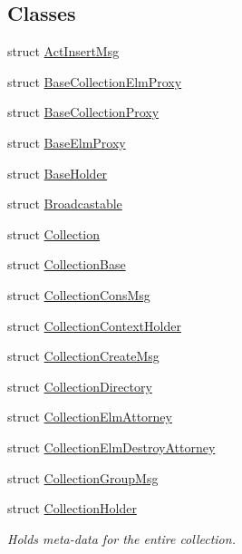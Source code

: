 \subsection*{Classes}
\begin{DoxyCompactItemize}
\item 
struct \hyperlink{structvt_1_1vrt_1_1collection_1_1_act_insert_msg}{Act\+Insert\+Msg}
\item 
struct \hyperlink{structvt_1_1vrt_1_1collection_1_1_base_collection_elm_proxy}{Base\+Collection\+Elm\+Proxy}
\item 
struct \hyperlink{structvt_1_1vrt_1_1collection_1_1_base_collection_proxy}{Base\+Collection\+Proxy}
\item 
struct \hyperlink{structvt_1_1vrt_1_1collection_1_1_base_elm_proxy}{Base\+Elm\+Proxy}
\item 
struct \hyperlink{structvt_1_1vrt_1_1collection_1_1_base_holder}{Base\+Holder}
\item 
struct \hyperlink{structvt_1_1vrt_1_1collection_1_1_broadcastable}{Broadcastable}
\item 
struct \hyperlink{structvt_1_1vrt_1_1collection_1_1_collection}{Collection}
\item 
struct \hyperlink{structvt_1_1vrt_1_1collection_1_1_collection_base}{Collection\+Base}
\item 
struct \hyperlink{structvt_1_1vrt_1_1collection_1_1_collection_cons_msg}{Collection\+Cons\+Msg}
\item 
struct \hyperlink{structvt_1_1vrt_1_1collection_1_1_collection_context_holder}{Collection\+Context\+Holder}
\item 
struct \hyperlink{structvt_1_1vrt_1_1collection_1_1_collection_create_msg}{Collection\+Create\+Msg}
\item 
struct \hyperlink{structvt_1_1vrt_1_1collection_1_1_collection_directory}{Collection\+Directory}
\item 
struct \hyperlink{structvt_1_1vrt_1_1collection_1_1_collection_elm_attorney}{Collection\+Elm\+Attorney}
\item 
struct \hyperlink{structvt_1_1vrt_1_1collection_1_1_collection_elm_destroy_attorney}{Collection\+Elm\+Destroy\+Attorney}
\item 
struct \hyperlink{structvt_1_1vrt_1_1collection_1_1_collection_group_msg}{Collection\+Group\+Msg}
\item 
struct \hyperlink{structvt_1_1vrt_1_1collection_1_1_collection_holder}{Collection\+Holder}
\begin{DoxyCompactList}\small\item\em Holds meta-\/data for the entire collection. \end{DoxyCompactList}\item 

\end{DoxyCompactItemize}
